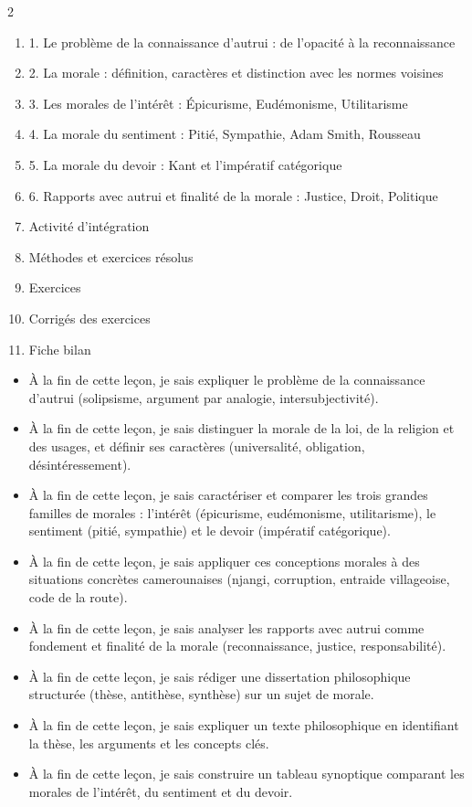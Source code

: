 \documentclass[11pt]{article}
\begin{document}
\begin{sommaire}
\begin{multicols}{2}
\begin{enumerate}
\item 1. Le problème de la connaissance d'autrui : de l'opacité à la reconnaissance
\item 2. La morale : définition, caractères et distinction avec les normes voisines
\item 3. Les morales de l'intérêt : Épicurisme, Eudémonisme, Utilitarisme
\item 4. La morale du sentiment : Pitié, Sympathie, Adam Smith, Rousseau
\item 5. La morale du devoir : Kant et l'impératif catégorique
\item 6. Rapports avec autrui et finalité de la morale : Justice, Droit, Politique
\item Activité d'intégration
\item Méthodes et exercices résolus
\item Exercices
\item Corrigés des exercices
\item Fiche bilan
\end{enumerate}
\end{multicols}
\end{sommaire}

\begin{objectifs}
\begin{itemize}
\item À la fin de cette leçon, je sais expliquer le problème de la connaissance d'autrui (solipsisme, argument par analogie, intersubjectivité).
\item À la fin de cette leçon, je sais distinguer la morale de la loi, de la religion et des usages, et définir ses caractères (universalité, obligation, désintéressement).
\item À la fin de cette leçon, je sais caractériser et comparer les trois grandes familles de morales : l'intérêt (épicurisme, eudémonisme, utilitarisme), le sentiment (pitié, sympathie) et le devoir (impératif catégorique).
\item À la fin de cette leçon, je sais appliquer ces conceptions morales à des situations concrètes camerounaises (njangi, corruption, entraide villageoise, code de la route).
\item À la fin de cette leçon, je sais analyser les rapports avec autrui comme fondement et finalité de la morale (reconnaissance, justice, responsabilité).
\item À la fin de cette leçon, je sais rédiger une dissertation philosophique structurée (thèse, antithèse, synthèse) sur un sujet de morale.
\item À la fin de cette leçon, je sais expliquer un texte philosophique en identifiant la thèse, les arguments et les concepts clés.
\item À la fin de cette leçon, je sais construire un tableau synoptique comparant les morales de l'intérêt, du sentiment et du devoir.
\end{itemize}
\end{objectifs}
\end{document}

